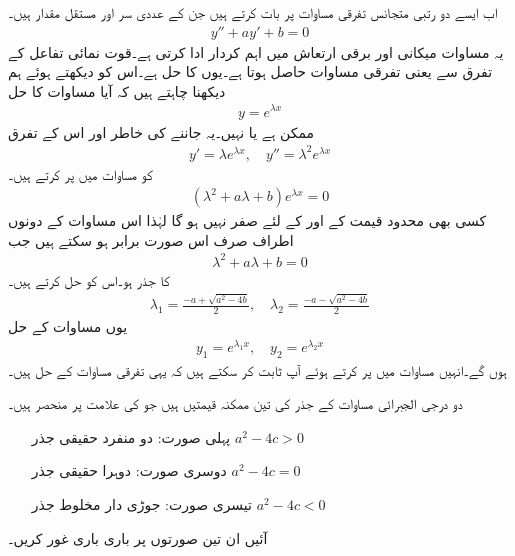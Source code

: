 اب ایسے دو رتبی متجانس تفرقی مساوات پر بات کرتے ہیں جن کے عددی سر  اور  مستقل مقدار ہیں۔
\begin{align}\label{مساوات_سادہ_دو_درجی_مستقل_عددی_سر_الف}
y''+ay'+b=0
\end{align} 
یہ مساوات میکانی اور برقی ارتعاش میں اہم کردار ادا کرتی ہے۔قوت نمائی تفاعل  کے تفرق سے  یعنی  تفرقی مساوات حاصل ہوتا ہے۔یوں  کا حل  ہے۔اس کو دیکھتے ہوئے ہم دیکھنا چاہتے ہیں کہ آیا مساوات  کا حل
\begin{align}\label{مساوات_سادہ_دو_درجی_مستقل_عددی_سر_ب}
y=e^{\lambda x}
\end{align}
 ممکن ہے یا نہیں۔یہ جاننے کی خاطر  اور اس کے تفرق
\begin{align*}
y'=\lambda e^{\lambda x}, \quad y''=\lambda^2 e^{\lambda x}
\end{align*}
 کو  مساوات  میں پر کرتے  ہیں۔
\begin{align*}
(\lambda^2+a\lambda+b)e^{\lambda x}=0
\end{align*}  
کسی بھی محدود قیمت کے  اور  کے لئے  صفر نہیں ہو گا لہٰذا اس مساوات کے دونوں اطراف صرف اس صورت برابر ہو سکتے ہیں جب  
 \begin{align}\label{مساوات_سادہ_دو_درجی_مستقل_عددی_سر_پ}
\lambda^2+a\lambda+b=0
\end{align}
 کا جذر ہو۔اس  کو حل کرتے ہیں۔
\begin{align}\label{مساوات_سادہ_دو_درجی_مستقل_عددی_سر_ت}
\lambda_1=\frac{-a+\sqrt{a^2-4b}}{2}, \quad \lambda_2=\frac{-a-\sqrt{a^2-4b}}{2}
\end{align}
یوں مساوات  کے حل
\begin{align}
y_1=e^{\lambda_1 x}, \quad y_2=e^{\lambda_2 x}
\end{align}
ہوں گے۔انہیں مساوات  میں پر کرتے ہوئے آپ ثابت کر سکتے ہیں کہ یہی تفرقی مساوات کے حل ہیں۔

دو درجی الجبرائی مساوات  کے جذر کی تین ممکنہ قیمتیں ہیں جو  کی علامت   پر منحصر ہیں۔
\begin{itemize}\label{لسٹ_سادہ_دو_درجی_تین_صورتیں_الف}
\item[پہلی صورت:]
دو منفرد حقیقی جذر \quad $a^2-4c>0$ 
\item[دوسری صورت:]
 دوہرا حقیقی جذر \quad $a^2-4c=0$ 
\item[تیسری صورت:]
 جوڑی دار مخلوط جذر \quad $a^2-4c<0$ 
\end{itemize}
آئیں ان تین صورتوں پر باری باری غور کریں۔

